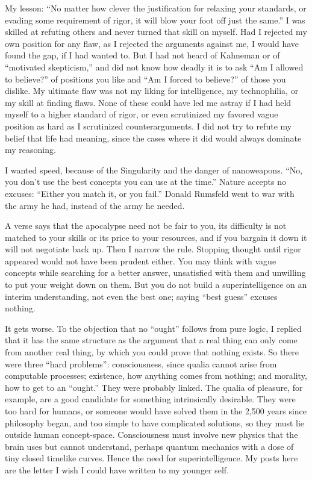 My lesson: ``No matter how clever the justification for relaxing your standards, or evading some requirement of rigor, it will blow your foot off just the same.'' I was skilled at refuting others and never turned that skill on myself. Had I rejected my own position for any flaw, as I rejected the arguments against me, I would have found the gap, if I had wanted to. But I had not heard of Kahneman or of ``motivated skepticism,'' and did not know how deadly it is to ask ``Am I allowed to believe?'' of positions you like and ``Am I forced to believe?'' of those you dislike. My ultimate flaw was not my liking for intelligence, my technophilia, or my skill at finding flaws. None of these could have led me astray if I had held myself to a higher standard of rigor, or even scrutinized my favored vague position as hard as I scrutinized counterarguments. I did not try to refute my belief that life had meaning, since the cases where it did would always dominate my reasoning.

I wanted speed, because of the Singularity and the danger of nanoweapons. ``No, you don't use the best concepts you can use at the time.'' Nature accepts no excuses: ``Either you match it, or you fail.'' Donald Rumsfeld went to war with the army he had, instead of the army he needed.

A verse says that the apocalypse need not be fair to you, its difficulty is not matched to your skills or its price to your resources, and if you bargain it down it will not negotiate back up. Then I narrow the rule. Stopping thought until rigor appeared would not have been prudent either. You may think with vague concepts while searching for a better answer, unsatisfied with them and unwilling to put your weight down on them. But you do not build a superintelligence on an interim understanding, not even the best one; saying ``best guess'' excuses nothing. 

It gets worse. To the objection that no ``ought'' follows from pure logic, I replied that it has the same structure as the argument that a real thing can only come from another real thing, by which you could prove that nothing exists. So there were three ``hard problems'': consciousness, since qualia cannot arise from computable processes; existence, how anything comes from nothing; and morality, how to get to an ``ought.'' They were probably linked. The qualia of pleasure, for example, are a good candidate for something intrinsically desirable. They were too hard for humans, or someone would have solved them in the 2,500 years since philosophy began, and too simple to have complicated solutions, so they must lie outside human concept-space. Consciousness must involve new physics that the brain uses but cannot understand, perhaps quantum mechanics with a dose of tiny closed timelike curves. Hence the need for superintelligence. My posts here are the letter I wish I could have written to my younger self. 

